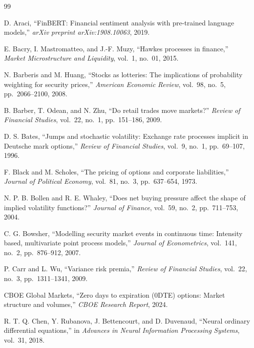\documentclass[10pt,twocolumn]{article}
\begin{document}
\noindent\hrulefill

\begin{thebibliography}{99}

D. Araci,
``FinBERT: Financial sentiment analysis with pre-trained language models,''
\textit{arXiv preprint arXiv:1908.10063}, 2019.

E. Bacry, I. Mastromatteo, and J.-F. Muzy,
``Hawkes processes in finance,''
\textit{Market Microstructure and Liquidity}, vol.~1, no.~01, 2015.

N. Barberis and M. Huang,
``Stocks as lotteries: The implications of probability weighting for security prices,''
\textit{American Economic Review}, vol.~98, no.~5, pp.~2066--2100, 2008.

B. Barber, T. Odean, and N. Zhu,
``Do retail trades move markets?''
\textit{Review of Financial Studies}, vol.~22, no.~1, pp.~151--186, 2009.

D. S. Bates,
``Jumps and stochastic volatility: Exchange rate processes implicit in Deutsche mark options,''
\textit{Review of Financial Studies}, vol.~9, no.~1, pp.~69--107, 1996.

F. Black and M. Scholes,
``The pricing of options and corporate liabilities,''
\textit{Journal of Political Economy}, vol.~81, no.~3, pp.~637--654, 1973.

N. P. B. Bollen and R. E. Whaley,
``Does net buying pressure affect the shape of implied volatility functions?''
\textit{Journal of Finance}, vol.~59, no.~2, pp.~711--753, 2004.

C. G. Bowsher,
``Modelling security market events in continuous time: Intensity based, multivariate point process models,''
\textit{Journal of Econometrics}, vol.~141, no.~2, pp.~876--912, 2007.

P. Carr and L. Wu,
``Variance risk premia,''
\textit{Review of Financial Studies}, vol.~22, no.~3, pp.~1311--1341, 2009.

CBOE Global Markets,
``Zero days to expiration (0DTE) options: Market structure and volumes,''
\textit{CBOE Research Report}, 2024.

R. T. Q. Chen, Y. Rubanova, J. Bettencourt, and D. Duvenaud,
``Neural ordinary differential equations,''
in \textit{Advances in Neural Information Processing Systems}, vol.~31, 2018.


\end{thebibliography}
\end{document}
